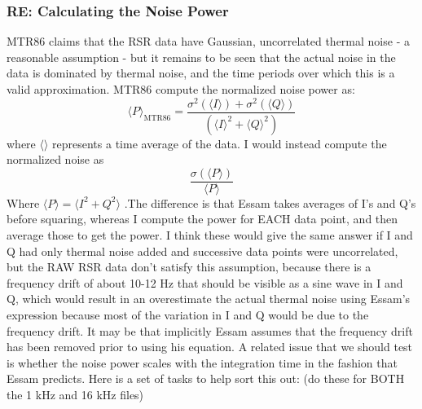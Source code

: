 \documentclass[crop=false,class=book]{standalone}
\begin{document}
\subsubsection{\footnotesize RE: Calculating the Noise Power}
MTR86 claims that the RSR data have Gaussian, uncorrelated thermal noise - a reasonable assumption - but it remains to be seen that the actual noise in the data is dominated by thermal noise, and the time periods over which this is a valid approximation. MTR86 compute the normalized noise power as:
\begin{equation}
\langle P \rangle_{\textrm{MTR86}} = \frac{\sigma^2(\langle I \rangle) + \sigma^2(\langle Q\rangle )}{(\langle I \rangle^2 + \langle Q \rangle^2)}
\end{equation}
where $\langle \rangle$ represents a time average of the data. I would instead compute the normalized noise as
\begin{equation*}
\frac{\sigma(\langle P \rangle)}{\langle P \rangle}
\end{equation*}
Where $\langle P \rangle = \langle I^2 + Q^2 \rangle$ .The difference is that Essam takes averages of I's and Q's before squaring, whereas I compute the power for EACH data point, and then average those to get the power. I think these would give the same answer if I and Q had only thermal noise added and successive data points were uncorrelated, but the RAW RSR data don't satisfy this assumption, because there is a frequency drift of about 10-12 Hz that should be visible as a sine wave in I and Q, which would result in an overestimate the actual thermal noise using Essam's expression because most of the variation in I and Q would be due to the frequency drift. It may be that implicitly Essam assumes that the frequency drift has been removed prior to using his equation. A related issue that we should test is whether the noise power scales with the integration time in the fashion that Essam predicts. Here is a set of tasks to help sort this out: (do these for BOTH the 1 kHz and 16 kHz files)
\end{document}
